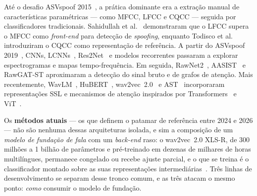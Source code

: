 \documentclass[12pt,a4paper]{article}
\begin{document}
Até o desafio ASVspoof 2015~\cite{wu2015asvspoof}, a prática dominante era a
extração manual de características paramétricas --- como MFCC, LFCC e CQCC ---
seguida por classificadores tradicionais. Sahidullah et al.~\cite{sahidullah2015comparison} demonstraram que o LFCC supera o MFCC como
\textit{front-end} para detecção de \textit{spoofing}, enquanto Todisco et al.~\cite{todisco2016new} introduziram o CQCC como representação de referência. A
partir do ASVspoof 2019~\cite{todisco2019asvspoof}, CNNs, LCNNs~\cite{lavrentyeva2017audio}, Res2Net~\cite{gao2021res2net} e modelos
recorrentes passaram a explorar espectrogramas e mapas tempo-frequência. Em
seguida, RawNet2~\cite{tak2021rawnet2}, AASIST~\cite{jung2022aasist} e
RawGAT-ST aproximaram a detecção do sinal bruto e de grafos de atenção. Mais
recentemente, WavLM~\cite{chen2022wavlm}, HuBERT~\cite{hsu2021hubert},
wav2vec~2.0~\cite{baevski2020wav2vec} e AST~\cite{gong2021ast} incorporaram
representações SSL e mecanismos de atenção inspirados por Transformers~\cite{vaswani2017attention} e ViT~\cite{dosovitskiy2021vit}.

Os \textbf{métodos atuais} --- os que definem o patamar de referência entre
\num{2024} e \num{2026} --- não são nenhuma dessas arquiteturas isolada, e sim
a composição de um \emph{modelo de fundação de fala} com um \textit{back-end}
raso: o wav2vec~2.0 XLS-R, de \num{300} milhões a \num{1} bilhão de parâmetros
e pré-treinado em dezenas de milhares de horas multilíngues, permanece
congelado ou recebe ajuste parcial, e o que se treina é o classificador montado
sobre as suas representações intermediárias~\cite{tak2022wav2vec}. Três linhas
de desenvolvimento se separam desse tronco comum, e as três atacam o mesmo
ponto: \emph{como} consumir o modelo de fundação.
\end{document}
